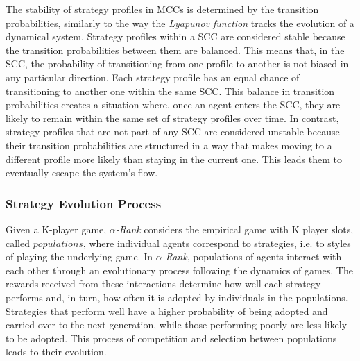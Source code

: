         \noindent
        The stability of strategy profiles in MCCs is determined by the transition probabilities, similarly to the way the \emph{Lyapunov function} tracks the evolution of a dynamical system. Strategy profiles within a SCC are considered stable because the transition probabilities between them are balanced. This means that, in the SCC, the probability of transitioning from one profile to another is not biased in any particular direction. Each strategy profile has an equal chance of transitioning to another one within the same SCC. This balance in transition probabilities creates a situation where, once an agent enters the SCC, they are likely to remain within the same set of strategy profiles over time. In contrast, strategy profiles that are not part of any SCC are considered unstable because their transition probabilities are structured in a way that makes moving to a different profile more likely than staying in the current one. This leads them to eventually escape the system's flow.

    \subsubsection{Strategy Evolution Process}

        Given a K-player game, \emph{$\alpha$-Rank} considers the empirical game with K player slots, called $populations$, where individual agents correspond to strategies, i.e. to styles of playing the underlying game. In \emph{$\alpha$-Rank}, populations of agents interact with each other through an evolutionary process following the dynamics of games. The rewards received from these interactions determine how well each strategy performs and, in turn, how often it is adopted by individuals in the populations. Strategies that perform well have a higher probability of being adopted and carried over to the next generation, while those performing poorly are less likely to be adopted. This process of competition and selection between populations leads to their evolution.\tinydouble


